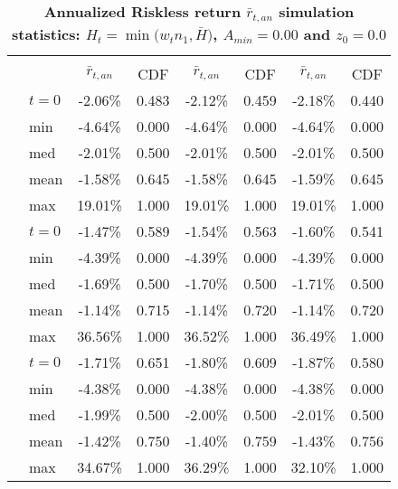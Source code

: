 \documentclass[letterpaper,12pt]{article}
\theoremstyle{definition}
\begin{document}
\begin{spacing}{1.5}
  \begin{table}[htbp]\centering\captionsetup{width=4.6in}
  \caption{\label{TabRiskl_A0}\textbf{Annualized Riskless return $\bar{r}_{t,an}$ simulation statistics: $H_t=\min\bigl(w_t n_1, \bar{H}\bigr)$, $A_{min}=0.00$ and $z_0=0.0$}}
    \begin{threeparttable}
    \begin{tabular}{>{\small}c >{\small}l| >{\small}c >{\small}c| >{\small}c >{\small}c| >{\small}c >{\small}c}
      \hline\hline
      & & \multicolumn{2}{c}{$k_{2,0}=0.11$} & \multicolumn{2}{c}{$k_{2,0}=0.14$} & \multicolumn{2}{c}{$k_{2,0}=0.17$} \\ \cline{3-8}
      & & $\bar{r}_{t,an}$ & CDF & $\bar{r}_{t,an}$ & CDF & $\bar{r}_{t,an}$ & CDF \\
      \hline
      \multirow{5}{*}{$\bar{H}=0.00$}
      & $t=0$ & -2.06\% & 0.483 & -2.12\% & 0.459 & -2.18\% & 0.440 \\
      & min & -4.64\% & 0.000 & -4.64\% & 0.000 & -4.64\% & 0.000 \\
      & med & -2.01\% & 0.500 & -2.01\% & 0.500 & -2.01\% & 0.500 \\
      & mean & -1.58\% & 0.645 & -1.58\% & 0.645 & -1.59\% & 0.645 \\
      & max & 19.01\% & 1.000 & 19.01\% & 1.000 & 19.01\% & 1.000 \\
      \hline
      \multirow{5}{*}{$\bar{H}=0.05$}
      & $t=0$ & -1.47\% & 0.589 & -1.54\% & 0.563 & -1.60\% & 0.541 \\
      & min & -4.39\% & 0.000 & -4.39\% & 0.000 & -4.39\% & 0.000 \\
      & med & -1.69\% & 0.500 & -1.70\% & 0.500 & -1.71\% & 0.500 \\
      & mean & -1.14\% & 0.715 & -1.14\% & 0.720 & -1.14\% & 0.720 \\
      & max & 36.56\% & 1.000 & 36.52\% & 1.000 & 36.49\% & 1.000 \\
      \hline
      \multirow{5}{*}{$\bar{H}=0.11$}
      & $t=0$ & -1.71\% & 0.651 & -1.80\% & 0.609 & -1.87\% & 0.580 \\
      & min & -4.38\% & 0.000 & -4.38\% & 0.000 & -4.38\% & 0.000 \\
      & med & -1.99\% & 0.500 & -2.00\% & 0.500 & -2.01\% & 0.500 \\
      & mean & -1.42\% & 0.750 & -1.40\% & 0.759 & -1.43\% & 0.756 \\
      & max & 34.67\% & 1.000 & 36.29\% & 1.000 & 32.10\% & 1.000 \\

\end{tabular}
\end{threeparttable}
\end{table}
\end{spacing}
\end{document}
